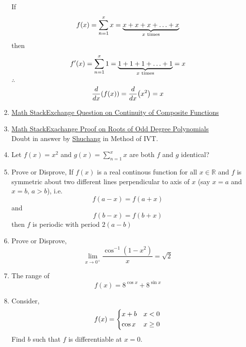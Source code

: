 \documentclass[18pt]{article}
\begin{document}
\begin{enumerate}
            If $$f(x)=\displaystyle\sum_{n=1}^{x} x=\underbrace{x+x+x+\ldots +x}_{x \hspace{1mm} \text{times}}$$
            then $$f'(x)=\displaystyle\sum_{n=1}^{x} 1=\underbrace{1+1+1+\ldots+1}_{x \hspace{1mm} \text{times}}=x$$
            $\therefore$ $$\dv{x}(f(x))=\dv{x}(x^2)=x$$
      \item \href{https://math.stackexchange.com/questions/4892287/is-this-result-on-continuity-of-composite-functions-true}{Math StackExchange Question on Continuity of Composite Functions}
      \item \href{https://math.stackexchange.com/questions/689575/proof-that-every-polynomial-of-odd-degree-has-one-real-root}{Math StackExachange Proof on Roots of Odd Degree Polynomials } \\ Doubt in answer by  \href{https://math.stackexchange.com/users/91982/shuchang}{Shuchang} in Method of IVT.
      \item Let $f(x)=x^2$ and $g(x)=\displaystyle\sum_{n=1}^{x}x$
            \newline \newline are both $f$ and $g$ identical?
      \item Prove or Disprove,
            If $f(x)$ is a real continous function for all $x \in \mathbb{R}$ and $f$ is symmetric about two different lines perpendicular to axis of $x$ (say $x=a$ and $x=b$, $a>b$), i.e. $$f(a-x)=f(a+x) $$ and $$f(b-x)=f(b+x)$$ then $f$ is periodic with period $2(a-b)$
      \item Prove or Disprove,
            $$\lim\limits_{x \to 0^+}{\dfrac{\cos^{-1} \left(1-x^2\right)}{x}}=\sqrt{2}$$
      \item The range of $$f(x)=8^{\cos x}+8^{\sin x}$$
      \item Consider, $$f(x)=\begin{dcases}
            x+b & x<0 \\
            \cos x & x \ge 0
      \end{dcases}$$
      Find $b$ such that $f$ is differentiable at $x=0$.
\end{enumerate}
\end{document}
